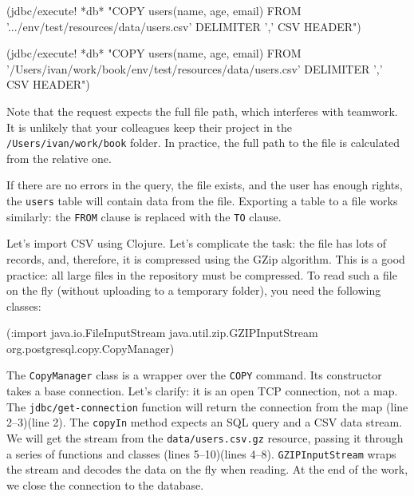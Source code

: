 \ifnarrow

\begin{english}
  \begin{clojure}
(jdbc/execute! *db*
 "COPY users(name, age, email)
  FROM
  '.../env/test/resources/data/users.csv'
  DELIMITER ',' CSV HEADER")
  \end{clojure}
\end{english}

\else

\begin{english}
  \begin{clojure}
(jdbc/execute! *db*
 "COPY users(name, age, email)
  FROM '/Users/ivan/work/book/env/test/resources/data/users.csv'
  DELIMITER ',' CSV HEADER")
  \end{clojure}
\end{english}

\fi

Note that the request expects the full file path, which interferes with teamwork. It is unlikely that your colleagues keep their project in the \verb|/Users/ivan/work/book| folder. In practice, the full path to the file is calculated from the relative one.

If there are no errors in the query, the file exists, and the user has enough rights, the \verb|users| table will contain data from the file. Exporting a table to a file works similarly: the \verb|FROM| clause is replaced with the \verb|TO| clause.


Let's import CSV using Clojure. Let's complicate the task: the file has lots of records, and, therefore, it is compressed using the GZip algorithm.
This is a good practice: all large files in the repository must be compressed. To read such a file on the fly (without uploading to a temporary folder), you need the following classes:

\begin{english}
  \begin{clojure}
(:import java.io.FileInputStream
         java.util.zip.GZIPInputStream
         org.postgresql.copy.CopyManager)
  \end{clojure}
\end{english}

The \verb|CopyManager| class is a wrapper over the \verb|COPY| command. Its constructor takes a base connection. Let's clarify: it is an open TCP connection, not a map. The \verb|jdbc/get-connection| function will return the connection from the map \ifnarrow (line 2--3)\else(line 2)\fi. The \verb|copyIn| method expects an SQL query and a CSV data stream. We will get the stream from the \verb|data/users.csv.gz| resource, passing it through a series of functions and classes \ifnarrow (lines 5--10)\else (lines 4--8)\fi. \verb|GZIPInputStream| wraps the stream and decodes the data on the fly when reading. At the end of the work, we close the connection to the database.

